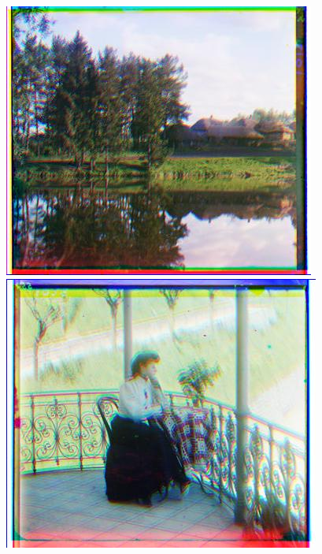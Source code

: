 \documentclass[12pt]{article}
\begin{document}
\begin{center}
\includegraphics[scale=0.6]{processed/processed-128-00163v.jpg}~
\includegraphics[scale=0.6]{processed/processed-128-00194v.jpg}
\end{center}
\end{document}
